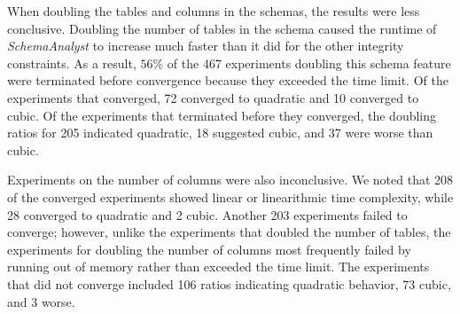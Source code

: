 When doubling the tables and columns in the schemas, the results were less conclusive. Doubling the number of tables in
the schema caused the runtime of \textit{SchemaAnalyst} to increase much faster than it did for the other integrity
constraints. As a result, $56\%$ of the 467 experiments doubling this schema feature were terminated before convergence
because they exceeded the time limit.  Of the experiments that converged, 72 converged to quadratic and 10 converged to
cubic.  Of the experiments that terminated before they converged, the doubling ratios for 205 indicated quadratic, 18
suggested cubic, and 37 were worse than cubic.

Experiments on the number of columns were also inconclusive.  We noted that 208 of the converged experiments showed
linear or linearithmic time complexity, while 28 converged to quadratic and 2 cubic.  Another 203 experiments failed to
converge; however, unlike the experiments that doubled the number of tables, the experiments for doubling the number of
columns most frequently failed by running out of memory rather than exceeded the time limit. The experiments that did not
converge included 106 ratios indicating quadratic behavior, 73 cubic, and 3 worse.


